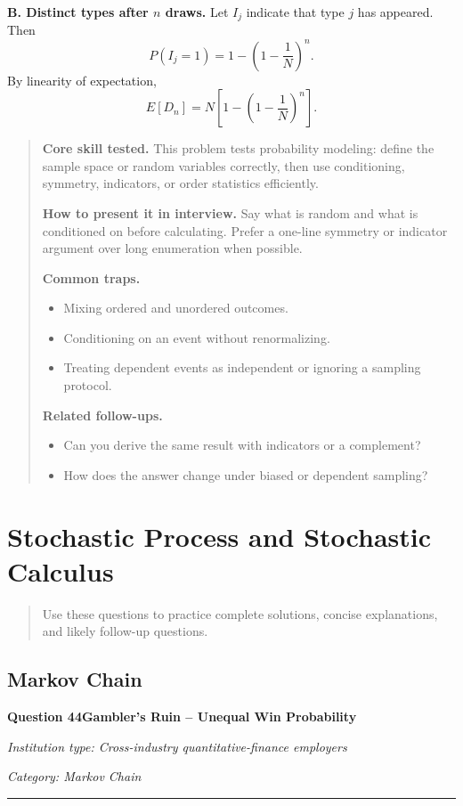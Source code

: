 \documentclass[11pt,letterpaper,openany]{book}
\newcommand{\ChapterIntro}[1]{%
  \begin{quote}\small #1\end{quote}%
}
\newenvironment{EditorialNote}
  {\begin{quote}\small\setlength{\parskip}{0.25em}}
  {\end{quote}}
\newcommand{\QuestionSpacer}{\vspace{0.4em}}
\newcommand{\FoundationQuestionHeader}[3]{%
  \vspace{1.0em}%
  {\large\bfseries #1\enspace #2\par}%
  {\small\itshape Institution type: Cross-industry quantitative-finance employers\par}%
  {\small\itshape Category: #3\par}%
  \vspace{0.25em}\hrule\vspace{0.45em}%
}
\begin{document}
\textbf{B. Distinct types after \(n\) draws.} Let \(I_j\) indicate that type \(j\) has appeared. Then
\[
P(I_j=1)=1-\left(1-\frac1N\right)^n.
\]
By linearity of expectation,
\[
\boxed{E[D_n]=N\left[1-\left(1-\frac1N\right)^n\right]}.
\]


\begin{EditorialNote}


\textbf{Core skill tested.} This problem tests probability modeling: define the sample space or random variables correctly, then use conditioning, symmetry, indicators, or order statistics efficiently.


\textbf{How to present it in interview.} Say what is random and what is conditioned on before calculating. Prefer a one-line symmetry or indicator argument over long enumeration when possible.


\textbf{Common traps.}
\begin{itemize}
\item Mixing ordered and unordered outcomes.
\item Conditioning on an event without renormalizing.
\item Treating dependent events as independent or ignoring a sampling protocol.
\end{itemize}


\textbf{Related follow-ups.}
\begin{itemize}
\item Can you derive the same result with indicators or a complement?
\item How does the answer change under biased or dependent sampling?
\end{itemize}


\end{EditorialNote}
\QuestionSpacer

\section{Stochastic Process and Stochastic Calculus}

\ChapterIntro{Use these questions to practice complete solutions, concise explanations, and likely follow-up questions.}

\subsection{Markov Chain}

\FoundationQuestionHeader{Question 44}{Gambler's Ruin -- Unequal Win Probability}{Markov Chain}
\end{document}

